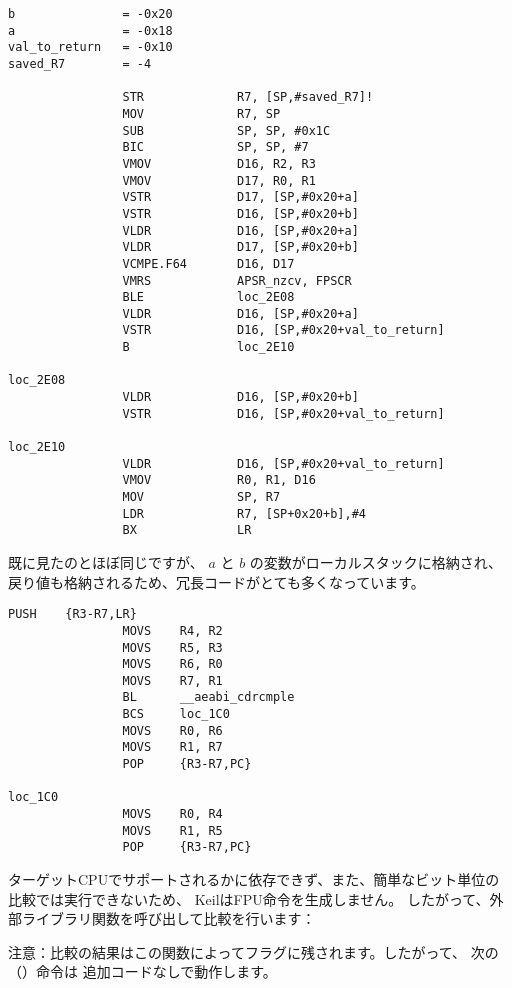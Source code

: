 \begin{lstlisting}[caption=\NonOptimizingXcodeIV (\ARMMode),style=customasmARM]
b               = -0x20
a               = -0x18
val_to_return   = -0x10
saved_R7        = -4

                STR             R7, [SP,#saved_R7]!
                MOV             R7, SP
                SUB             SP, SP, #0x1C
                BIC             SP, SP, #7
                VMOV            D16, R2, R3
                VMOV            D17, R0, R1
                VSTR            D17, [SP,#0x20+a]
                VSTR            D16, [SP,#0x20+b]
                VLDR            D16, [SP,#0x20+a]
                VLDR            D17, [SP,#0x20+b]
                VCMPE.F64       D16, D17
                VMRS            APSR_nzcv, FPSCR
                BLE             loc_2E08
                VLDR            D16, [SP,#0x20+a]
                VSTR            D16, [SP,#0x20+val_to_return]
                B               loc_2E10

loc_2E08
                VLDR            D16, [SP,#0x20+b]
                VSTR            D16, [SP,#0x20+val_to_return]

loc_2E10
                VLDR            D16, [SP,#0x20+val_to_return]
                VMOV            R0, R1, D16
                MOV             SP, R7
                LDR             R7, [SP+0x20+b],#4
                BX              LR
\end{lstlisting}

既に見たのとほぼ同じですが、
$a$ と $b$ の変数がローカルスタックに格納され、戻り値も格納されるため、冗長コードがとても多くなっています。

\myparagraph{\OptimizingKeilVI (\ThumbMode)}

\begin{lstlisting}[caption=\OptimizingKeilVI (\ThumbMode),style=customasmARM]
                PUSH    {R3-R7,LR}
                MOVS    R4, R2
                MOVS    R5, R3
                MOVS    R6, R0
                MOVS    R7, R1
                BL      __aeabi_cdrcmple
                BCS     loc_1C0
                MOVS    R0, R6
                MOVS    R1, R7
                POP     {R3-R7,PC}

loc_1C0
                MOVS    R0, R4
                MOVS    R1, R5
                POP     {R3-R7,PC}
\end{lstlisting}

ターゲットCPUでサポートされるかに依存できず、また、簡単なビット単位の比較では実行できないため、
KeilはFPU命令を生成しません。
したがって、外部ライブラリ関数を呼び出して比較を行います：

注意：比較の結果はこの関数によってフラグに残されます。したがって、
次の（）命令は
追加コードなしで動作します。
